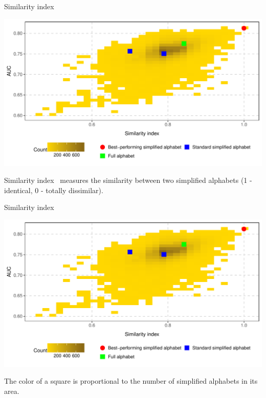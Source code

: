 \documentclass{beamer}\usepackage[]{graphicx}\usepackage[]{color}
\makeatletter
\def\maxwidth{ %
  \ifdim\Gin@nat@width>\linewidth
    \linewidth
  \else
    \Gin@nat@width
  \fi
}
\newenvironment{knitrout}{}{} %
\makeatother
\begin{document}
\begin{frame}{Similarity index}
\begin{knitrout}
\color{fgcolor}

{\centering \includegraphics[width=\maxwidth]{figure/unnamed-chunk-17-1} 

}



\end{knitrout}
Similarity index~\citep{stephenson_unearthing_2013} measures the similarity between two simplified alphabets (1 - identical, 0 - totally dissimilar).
\end{frame}



\begin{frame}{Similarity index}
\begin{knitrout}
\color{fgcolor}

{\centering \includegraphics[width=\maxwidth]{figure/unnamed-chunk-18-1} 

}



\end{knitrout}
The color of a square is proportional to the number of simplified alphabets in its area.
\end{frame}
\end{document}
